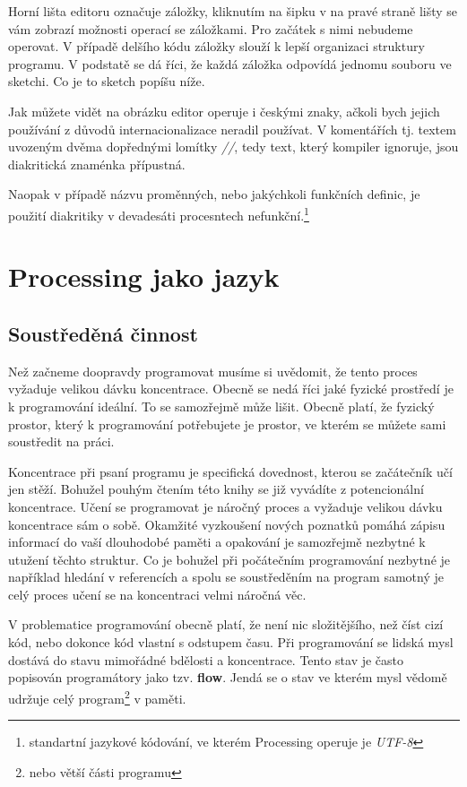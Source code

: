 \documentclass[11pt]{book}
\newcommand{\oddil}[1]{\section{#1}\label{sec:#1}}
\newcommand{\slovnik}[1]{\textbf{\gls{#1}}\index{#1}}
\begin{document}
Horní lišta editoru označuje záložky, kliknutím na šipku v na pravé straně lišty se vám zobrazí možnosti operací se záložkami. Pro začátek s nimi nebudeme operovat. V případě delšího kódu záložky slouží k lepší organizaci struktury programu. V podstatě se dá říci, že každá záložka odpovídá jednomu souboru ve sketchi. Co je to sketch popíšu níže.

Jak můžete vidět na obrázku editor operuje i českými znaky, ačkoli bych jejich používání z důvodů internacionalizace neradil používat. V komentářích tj. textem uvozeným dvěma dopřednými lomítky {\em //}, tedy text, který kompiler ignoruje, jsou diakritická znaménka přípustná.

Naopak v případě názvu proměnných, nebo jakýchkoli funkčních definic, je použití diakritiky v devadesáti procesntech nefunkční.\footnote{standartní jazykové kódování, ve kterém Processing operuje je {\em UTF-8}}




\chapter{Processing jako jazyk}

\oddil{Soustředěná činnost}

Než začneme doopravdy programovat musíme si uvědomit, že tento proces vyžaduje velikou dávku koncentrace. Obecně se nedá říci jaké fyzické prostředí je k programování ideální. To se samozřejmě může lišit. Obecně platí, že fyzický prostor, který k programování potřebujete je prostor, ve kterém se můžete sami soustředit na práci.

Koncentrace při psaní programu je specifická dovednost, kterou se začátečník učí jen stěží. Bohužel pouhým čtením této knihy se již vyvádíte z potencionální koncentrace. Učení se programovat je náročný proces a vyžaduje velikou dávku koncentrace sám o sobě. Okamžité vyzkoušení nových poznatků pomáhá zápisu informací do vaší dlouhodobé paměti a opakování je samozřejmě nezbytné k utužení těchto struktur. Co je bohužel při počátečním programování nezbytné je například hledání v referencích a spolu se soustředěním na program samotný je celý proces učení se na koncentraci velmi náročná věc.



V problematice programování obecně platí, že není nic složitějšího, než číst cizí kód, nebo dokonce kód vlastní s odstupem času. Při programování se lidská mysl dostává do stavu mimořádné bdělosti a koncentrace. Tento stav je často popisován programátory jako tzv. \slovnik{flow}. Jendá se o stav ve kterém mysl vědomě udržuje celý program\footnote{nebo větší části programu} v paměti.
\end{document}
